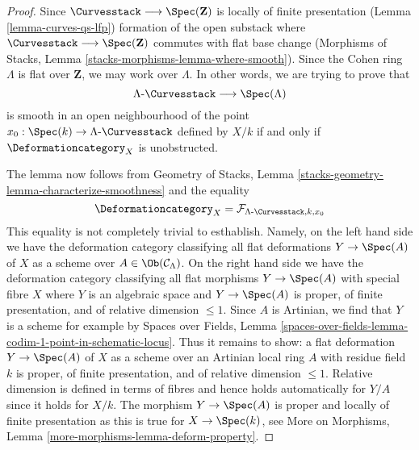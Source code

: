\begin{proof}
Since $\Curvesstack \longrightarrow \Spec(\mathbf{Z})$ is locally
of finite presentation (Lemma \ref{lemma-curves-qs-lfp})
formation of the open substack where
$\Curvesstack \longrightarrow \Spec(\mathbf{Z})$ commutes with
flat base change
(Morphisms of Stacks, Lemma \ref{stacks-morphisms-lemma-where-smooth}).
Since the Cohen ring $\Lambda$ is flat over $\mathbf{Z}$,
we may work over $\Lambda$. In other words, we are trying to prove that
$$
\Lambda\text{-}\Curvesstack \longrightarrow \Spec(\Lambda)
$$
is smooth in an open neighbourhood of the point
$x_0 : \Spec(k) \to \Lambda\text{-}\Curvesstack$
defined by $X/k$ if and only if $\Deformationcategory_X$ is unobstructed.

\medskip\noindent
The lemma now follows from
Geometry of Stacks, Lemma \ref{stacks-geometry-lemma-characterize-smoothness}
and the equality
$$
\Deformationcategory_X =
\mathcal{F}_{\Lambda\text{-}\Curvesstack, k, x_0}
$$
This equality is not completely trivial to esthablish. Namely, on the left
hand side we have the deformation category classifying all flat deformations
$Y \to \Spec(A)$ of $X$ as a scheme over $A \in \Ob(\mathcal{C}_\Lambda)$.
On the right hand side we have the deformation category classifying all
flat morphisms $Y \to \Spec(A)$ with special fibre $X$
where $Y$ is an algebraic space and
$Y \to \Spec(A)$ is proper, of finite presentation, and of
relative dimension $\leq 1$. Since $A$ is Artinian, we find
that $Y$ is a scheme for example by Spaces over Fields, Lemma
\ref{spaces-over-fields-lemma-codim-1-point-in-schematic-locus}.
Thus it remains to show: a flat deformation $Y \to \Spec(A)$ of
$X$ as a scheme over an Artinian local ring $A$ with residue field $k$
is proper, of finite presentation, and of relative dimension $\leq 1$.
Relative dimension is defined in terms of fibres and hence holds
automatically for $Y/A$ since it holds for $X/k$.
The morphism $Y \to \Spec(A)$ is proper and locally of finite presentation
as this is true for $X \to \Spec(k)$, see
More on Morphisms, Lemma \ref{more-morphisms-lemma-deform-property}.
\end{proof}

